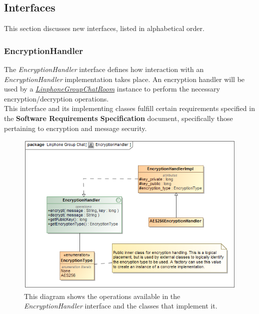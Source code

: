 \documentclass[11pt]{article}
\begin{document}
\subsection{Interfaces}
This section discusses new interfaces, listed in alphabetical order.
\subsubsection{EncryptionHandler}
The \textit{EncryptionHandler} interface defines how interaction with an \textit{EncryptionHandler} implementation takes place. An encryption handler will be used by a \textit{ \hyperref[subsubsec: linphonegroupchatroom]{LinphoneGroupChatRoom}} instance to perform the necessary encryption/decryption operations.\\
This interface and its implementing classes fulfill certain requirements specified in the \textbf{Software Requirements Specification} document, specifically those pertaining to encryption and message security.
\begin{figure}[H]
\centering
\includegraphics[width=5in]{./images/class_encryption_handler.png}
\caption[EncrpytionHandler Class Diagram]{This diagram shows the operations available in the \textit{EncryptionHandler} interface and the classes that implement it.}
\label{cd-encryption-handler}
\end{figure}
\end{document}
